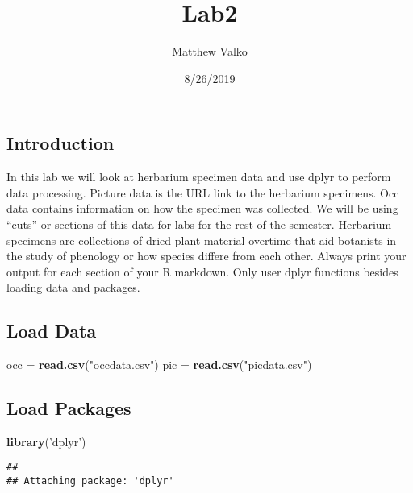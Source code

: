 \documentclass[
]{article}
\title{Lab2}
\author{Matthew Valko}
\date{8/26/2019}
\newenvironment{Shaded}{\begin{snugshade}}{\end{snugshade}}
\newcommand{\KeywordTok}[1]{\textcolor[rgb]{0.13,0.29,0.53}{\textbf{#1}}}
\newcommand{\NormalTok}[1]{#1}
\newcommand{\StringTok}[1]{\textcolor[rgb]{0.31,0.60,0.02}{#1}}
\begin{document}
\maketitle

\hypertarget{introduction}{%
\subsection{Introduction}\label{introduction}}

In this lab we will look at herbarium specimen data and use dplyr to
perform data processing. Picture data is the URL link to the herbarium
specimens. Occ data contains information on how the specimen was
collected. We will be using ``cuts'' or sections of this data for labs
for the rest of the semester. Herbarium specimens are collections of
dried plant material overtime that aid botanists in the study of
phenology or how species differe from each other. Always print your
output for each section of your R markdown. Only user dplyr functions
besides loading data and packages.

\hypertarget{load-data}{%
\subsection{Load Data}\label{load-data}}

\begin{Shaded}
\begin{Highlighting}[]
\NormalTok{occ =}\StringTok{ }\KeywordTok{read.csv}\NormalTok{(}\StringTok{"occdata.csv"}\NormalTok{)}
\NormalTok{pic =}\StringTok{ }\KeywordTok{read.csv}\NormalTok{(}\StringTok{"picdata.csv"}\NormalTok{)}
\end{Highlighting}
\end{Shaded}

\hypertarget{load-packages}{%
\subsection{Load Packages}\label{load-packages}}

\begin{Shaded}
\begin{Highlighting}[]
\KeywordTok{library}\NormalTok{(}\StringTok{'dplyr'}\NormalTok{)}
\end{Highlighting}
\end{Shaded}

\begin{verbatim}
## 
## Attaching package: 'dplyr'
\end{verbatim}
\end{document}
